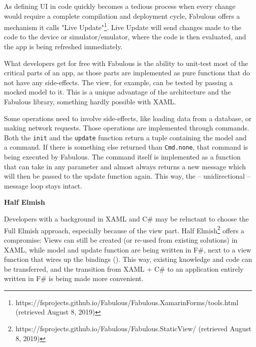 As defining UI in code quickly becomes a tedious process when every change would require a complete compilation and deployment cycle, Fabulous offers a mechanism it calls "Live Update"\footnote{https://fsprojects.github.io/Fabulous/Fabulous.XamarinForms/tools.html (retrieved August 8, 2019)}. Live Update will send changes made to the code to the device or simulator/emulator, where the code is then evaluated, and the app is being refreshed immediately.

What developers get for free with Fabulous is the ability to unit-test most of the critical parts of an app, as those parts are implemented as pure functions that do not have any side-effects. The view, for example, can be tested by passing a mocked model to it. This is a unique advantage of the architecture and the Fabulous library, something hardly possible with XAML.

Some operations need to involve side-effects, like loading data from a database, or making network requests. Those operations are implemented through commands. Both the \texttt{init} and the \texttt{update} function return a tuple containing the model and a command. If there is something else returned than \texttt{Cmd.none}, that command is being executed by Fabulous. The command itself is implemented as a function that can take in any parameter and almost always returns a new message which will then be passed to the update function again. This way, the – unidirectional – message loop stays intact.

\textbf{Half Elmish}

Developers with a background in XAML and C\# may be reluctant to choose the Full Elmish approach, especially because of the view part. Half Elmish\footnote{https://fsprojects.github.io/Fabulous/Fabulous.StaticView/ (retrieved August 8, 2019)} offers a compromise: Views can still be created (or re-used from existing solutions) in XAML, while model and update function are being written in F\#, next to a view function that wires up the bindings (\cite{bennett_building_2018}). This way, existing knowledge and code can be transferred, and the transition from XAML + C\# to an application entirely written in F\# is being made more convenient.

